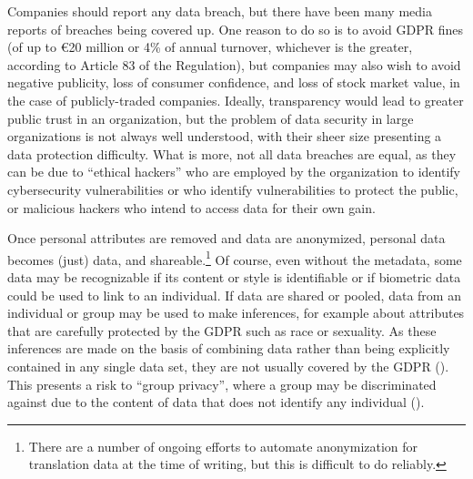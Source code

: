 \documentclass[output=paper]{langscibook}
\begin{document}
Companies should report any data breach, but there have been many media reports of breaches being covered up. One reason to do so is to avoid GDPR fines (of up to €20 million or 4\% of annual turnover, whichever is the greater, according to Article 83 of the Regulation), but companies may also wish to avoid negative publicity, loss of consumer confidence, and loss of stock market value, in the case of publicly-traded companies. Ideally, transparency would lead to greater public trust in an organization, but the problem of data security in large organizations is not always well understood, with their sheer size presenting a data protection difficulty. What is more, not all data breaches are equal, as they can be due to “ethical hackers” who are employed by the organization to identify cybersecurity vulnerabilities or who identify vulnerabilities to protect the public, or malicious hackers who intend to access data for their own gain.

Once personal attributes are removed and data are anonymized, personal data becomes (just) data, and shareable.\footnote{There are a number of ongoing efforts to automate anonymization for translation data at the time of writing, but this is difficult to do reliably.} Of course, even without the metadata, some data may be recognizable if its content or style is identifiable or if biometric data could be used to link to an individual. If data are shared or pooled, data from an individual or group may be used to make inferences, for example about attributes that are carefully protected by the GDPR such as race or sexuality. As these inferences are made on the basis of combining data rather than being explicitly contained in any single data set, they are not usually covered by the GDPR (\citealt{WachterMittelstadt2019}). This presents a risk to “group privacy”, where a group may be discriminated against due to the content of data that does not identify any individual (\citealt{FloridiTaddeo2016}).
\end{document}
